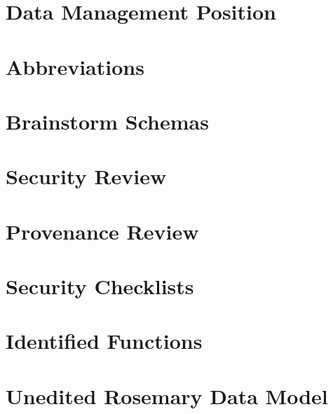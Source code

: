 \documentclass[a4paper]{report}
\begin{document}
	
	
	
	
	
	
	\chapter{Data Management Position}
	\label{position}
	
	
	
	
	
	
	
	
	
	\clearpage
	
	
	\appendix
	\chapter{Abbreviations}
	\label{abbreviations}
	
	
	
	\chapter{Brainstorm Schemas}
	\label{brainstorm-before-after}
	
	
	
	\chapter{Security Review}
	\label{security-review-appendix}
	
	
	
	
	
	\chapter{Provenance Review}
	\label{provenance-review-appendix}
	
	
	
	\chapter{Security Checklists}
	\label{security-appendix}
	
	
	
	\chapter{Identified Functions}
	\label{identified-functions}
	
	
	
	\chapter{Unedited Rosemary Data Model}
	\label{unedited-datamodel}
	
	
\end{document}
